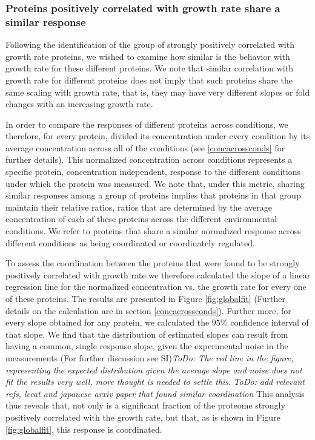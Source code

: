 \documentclass[notitlepage]{article}
\begin{document}
\subsubsection{Proteins positively correlated with growth rate share a similar response}
\label{propchange}
Following the identification of the group of strongly positively correlated with growth rate proteins, we wished to examine how similar is the behavior with growth rate for these different proteins.
We note that similar correlation with growth rate for different proteins does not imply that such proteins share the same scaling with growth rate, that is,  they may have very different slopes or fold changes with an increasing growth rate.

In order to compare the responses of different proteins across conditions, we therefore, for every protein, divided its concentration under every condition by its average concentration across all of the conditions (see \ref{concacrossconds} for further details).
This normalized concentration across conditions represents a specific protein, concentration independent, response to the different conditions under which the protein was measured.
We note that, under this metric, sharing similar responses among a group of proteins implies that proteins in that group maintain their relative ratios, ratios that are determined by the average concentration of each of these proteins across the different environmental conditions.
We refer to proteins that share a similar normalized response across different conditions as being coordinated or coordinately regulated.

To assess the coordination between the proteins that were found to be strongly positively correlated with growth rate we therefore calculated the slope of a linear regression line for the normalized concentration vs. the growth rate for every one of these proteins.
The results are presented in Figure \ref{fig:globalfit} (Further details on the calculation are in section \ref{concacrossconds}).
Further more, for every slope obtained for any protein, we calculated the $95\%$ confidence interval of that slope.
We find that the distribution of estimated slopes can result from having a common, single response slope, given the experimental noise in the measurements (For further discussion see SI)\emph{ToDo: The red line in the figure, representing the expected distribution given the average slope and noise does not fit the results very well, more thought is needed to settle this}.
\emph{ToDo: add relevant refs, leeat and japanese arxiv paper that found similar coordination}
This analysis thus reveals that, not only is a significant fraction of the proteome strongly positively correlated with the growth rate, but that, as is shown in Figure \ref{fig:globalfit}, this response is coordinated.
\end{document}
